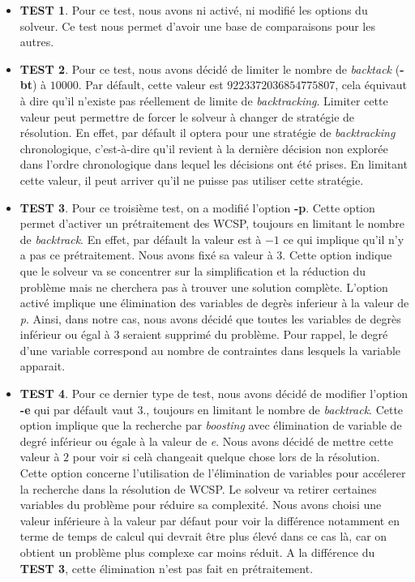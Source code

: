 \documentclass[a4paper, 10pt]{article}
\begin{document}
      \begin{itemize}
        \item \textbf{TEST 1}. Pour ce test, nous avons ni activé, ni modifié les options du solveur. Ce test nous permet d'avoir une base de comparaisons pour les autres.
        \item \textbf{TEST 2}. Pour ce test, nous avons décidé de limiter le nombre de \textit{backtack} (\textbf{-bt}) à $10000$. Par défault, cette valeur est $9223372036854775807$, cela équivaut à dire qu'il n'existe pas réellement de limite de \textit{backtracking}. Limiter cette valeur peut permettre de forcer le solveur à changer de stratégie de résolution. En effet, par défault il optera pour une stratégie de \textit{backtracking} chronologique, c'est-à-dire qu'il revient à la dernière décision non explorée dans l'ordre chronologique dans lequel les décisions ont été prises. En limitant cette valeur, il peut arriver qu'il ne puisse pas utiliser cette stratégie.
        \item \textbf{TEST 3}. Pour ce troisième test, on a modifié l'option \textbf{-p}. Cette option permet d'activer un prétraitement des WCSP, toujours en limitant le nombre de \textit{backtrack}. En effet, par défault la valeur est à $-1$ ce qui implique qu'il n'y a pas ce prétraitement. Nous avons fixé sa valeur à $3$. Cette option indique que le solveur va se concentrer sur la simplification et la réduction du problème mais ne cherchera pas à trouver une solution complète. L'option activé implique une élimination des variables de degrès inferieur à la valeur de \textit{p}. Ainsi, dans notre cas, nous avons décidé que toutes les variables de degrès inférieur ou égal à $3$ seraient supprimé du problème. Pour rappel, le degré d'une variable correspond au nombre de contraintes dans lesquels la variable apparait.
        \item \textbf{TEST 4}. Pour ce dernier type de test, nous avons décidé de modifier l'option \textbf{-e} qui par défault vaut $3$., toujours en limitant le nombre de \textit{backtrack}. Cette option implique que la recherche par \textit{boosting} avec élimination de variable de degré inférieur ou égale à la valeur de \textit{e}. Nous avons décidé de mettre cette valeur à $2$ pour voir si celà changeait quelque chose lors de la résolution. Cette option concerne l'utilisation de l'élimination de variables pour accélerer la recherche dans la résolution de WCSP. Le solveur va retirer certaines variables du problème pour réduire sa complexité. Nous avons choisi une valeur inférieure à la valeur par défaut pour voir la différence notamment en terme de temps de calcul qui devrait être plus élevé dans ce cas là, car on obtient un problème plus complexe car moins réduit. A la différence du \textbf{TEST 3}, cette élimination n'est pas fait en prétraitement.
      \end{itemize}
\end{document}
